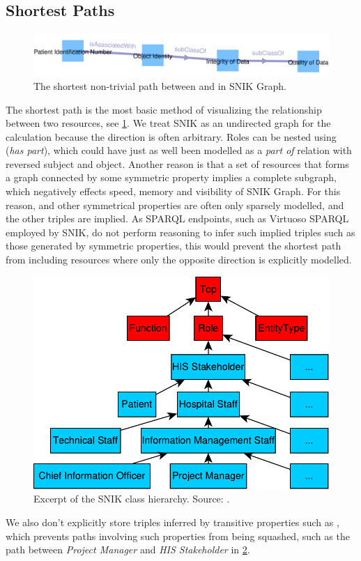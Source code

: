 \documentclass[conference]{IEEEtran}
\begin{document}
\subsection{Shortest Paths}
\begin{figure}[h!]
    \centering
    \includegraphics[width=\linewidth]{path.png}
    \caption{The shortest non-trivial path between  and  in SNIK Graph.}
	\label{fig:path}
\end{figure}
\vspace{-3pt}
The shortest path is the most basic method of visualizing the relationship between two resources, see \cref{fig:path}.
We treat SNIK as an undirected graph for the calculation because the direction is often arbitrary.
Roles can be nested using  (\emph{has part}), which could have just as well been modelled as a \emph{part of} relation with reversed subject and object.
Another reason is that a set of resources that forms a graph connected by some symmetric property implies a complete subgraph, which negatively effects speed, memory and visibility of SNIK Graph.
For this reason,  and other symmetrical properties are often only sparsely modelled, and the other triples are implied.
As SPARQL endpoints, such as Virtuoso SPARQL employed by SNIK, do not perform reasoning to infer such implied triples such as those generated by symmetric properties, this would prevent the shortest path from including resources where only the opposite direction is explicitly modelled.%
\begin{figure}[h]
    \centering
    \includegraphics[width=0.5\linewidth]{hierarchy.pdf}
    \caption{Excerpt of the SNIK class hierarchy. Source: \cite{snikposter}.}
	\label{fig:hierarchy}
\end{figure}
\vspace{-3pt}
We also don't explicitly store triples inferred by transitive properties such as , which prevents paths involving such properties from being squashed, such as the path between \emph{Project Manager} and \emph{HIS Stakeholder} in \cref{fig:hierarchy}.
\end{document}
